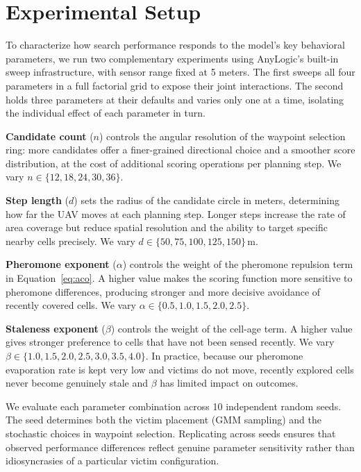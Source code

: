 \documentclass[10pt,a4paper,twocolumn]{article}
\begin{document}
\section{Experimental Setup}

To characterize how search performance responds to the model's key behavioral parameters, we run two complementary experiments using AnyLogic's built-in sweep infrastructure, with sensor range fixed at 5 meters. The first sweeps all four parameters in a full factorial grid to expose their joint interactions. The second holds three parameters at their defaults and varies only one at a time, isolating the individual effect of each parameter in turn.

\textbf{Candidate count} ($n$) controls the angular resolution of the waypoint selection ring: more candidates offer a finer-grained directional choice and a smoother score distribution, at the cost of additional scoring operations per planning step. We vary $n \in \{12, 18, 24, 30, 36\}$.

\textbf{Step length} ($d$) sets the radius of the candidate circle in meters, determining how far the UAV moves at each planning step. Longer steps increase the rate of area coverage but reduce spatial resolution and the ability to target specific nearby cells precisely. We vary $d \in \{50, 75, 100, 125, 150\}$\,m.

\textbf{Pheromone exponent} ($\alpha$) controls the weight of the pheromone repulsion term in Equation~\eqref{eq:aco}. A higher value makes the scoring function more sensitive to pheromone differences, producing stronger and more decisive avoidance of recently covered cells. We vary $\alpha \in \{0.5, 1.0, 1.5, 2.0, 2.5\}$.

\textbf{Staleness exponent} ($\beta$) controls the weight of the cell-age term. A higher value gives stronger preference to cells that have not been sensed recently. We vary $\beta \in \{1.0, 1.5, 2.0, 2.5, 3.0, 3.5, 4.0\}$. In practice, because our pheromone evaporation rate is kept very low and victims do not move, recently explored cells never become genuinely stale and $\beta$ has limited impact on outcomes.

We evaluate each parameter combination across 10 independent random seeds. The seed determines both the victim placement (GMM sampling) and the stochastic choices in waypoint selection. Replicating across seeds ensures that observed performance differences reflect genuine parameter sensitivity rather than idiosyncrasies of a particular victim configuration.
\end{document}
